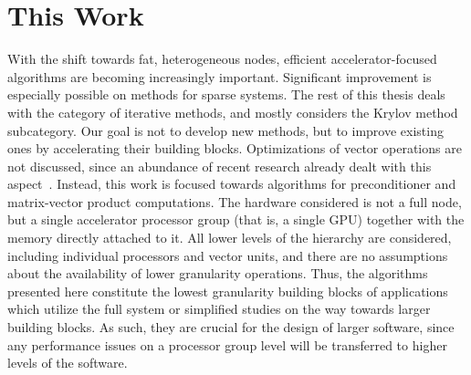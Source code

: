 \section{This Work}

With the shift towards fat, heterogeneous nodes, efficient accelerator-focused
algorithms are becoming increasingly important. Significant improvement is
especially possible on methods for sparse systems. The rest of this thesis deals
with the category of iterative methods, and mostly considers the Krylov method
subcategory. Our goal is not to develop new methods, but to improve existing
ones by accelerating their building blocks. Optimizations of vector operations
are not discussed, since an abundance of recent research already dealt with this
aspect~\cite{joaqin-thesis}. Instead, this work is focused towards algorithms
for preconditioner and matrix-vector product computations. The hardware
considered is not a full node, but a single accelerator processor group (that
is, a single GPU) together with the memory directly attached to it. All lower
levels of the hierarchy are considered, including individual processors and
vector units, and there are no assumptions about the availability of lower
granularity operations. Thus, the algorithms presented here constitute the
lowest granularity building blocks of applications which utilize the full system
or simplified studies on the way towards larger building blocks. As such, they
are crucial for the design of larger software, since any performance issues on a
processor group level will be transferred to higher levels of the software.

